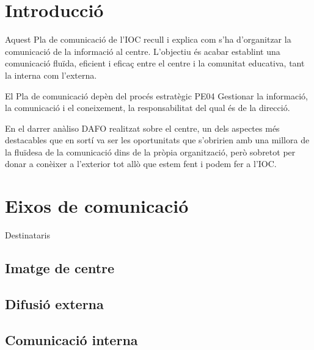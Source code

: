 \documentclass[fontsize=10pt,%
 4444paper=a4,%
 4444%
 4444%
 4444DIV=14,%
 4444twoside,%
 4444pagesize=auto,%
 4444%
 4444parskip=half,
 4444%
 4444captions=tableheading,%
 4444numbers=noenddot,%
 4444toc=graduated%
 4444%
]{scrartcl}
\begin{document}



\thispagestyle{empty}
\setcounter{tocdepth}{4}
\tableofcontents

\clearpage

\pagestyle{scrheadings}


\section{Introducció}\label{sec:intro}

Aquest Pla de comunicació de l'IOC recull i explica com s'ha d'organitzar la comunicació de la informació al centre. L'objectiu és acabar establint una comunicació fluïda, eficient i eficaç entre el centre i la comunitat educativa, tant la interna com l'externa.

El Pla de comunicació depèn del procés estratègic PE04 Gestionar la informació, la comunicació i el coneixement, la responsabilitat del qual és de la direcció.

En el darrer anàliso DAFO realitzat sobre el centre, un dels aspectes més destacables que en sortí va ser les oportunitats que s'obririen amb una millora de la fluïdesa de la comunicació dins de la pròpia organització, però sobretot per donar a conèixer a l'exterior tot allò que estem fent i podem fer a l'IOC.

\section{Eixos de comunicació}\label{sec:eixos}

Destinataris

\subsection{Imatge de centre}

\subsection{Difusió externa}

\subsection{Comunicació interna}
\end{document}
